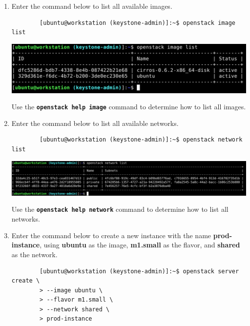 \documentclass[letterpaper, 12pt]{article}
\begin{document}
\begin{enumerate}
    \item Enter the command below to list all available images.
    \begin{lstlisting}
        [ubuntu@workstation (keystone-admin)]:~$ openstack image list
    \end{lstlisting}

    \begin{center}
        \includegraphics[width=\linewidth]{images/part2/step11.png}
    \end{center}

    \begin{tipbox}
        Use the \textbf{\texttt{openstack help image}} command to determine how to list all images.
    \end{tipbox}

    \item Enter the command below to list all available networks.
    \begin{lstlisting}
        [ubuntu@workstation (keystone-admin)]:~$ openstack network list
    \end{lstlisting}

    \begin{center}
        \includegraphics[width=\linewidth]{images/part2/step12.png}
    \end{center}

    \begin{tipbox}
        Use the \textbf{\texttt{openstack help network}} command to determine how to list all networks.
    \end{tipbox}

    \item Enter the command below to create a new instance with the name \textbf{prod-instance}, using
    \textbf{ubuntu} as the image, \textbf{m1.small} as the flavor, and \textbf{shared} as the network.
    \begin{lstlisting}
        [ubuntu@workstation (keystone-admin)]:~$ openstack server create \
        > --image ubuntu \
        > --flavor m1.small \
        > --network shared \
        > prod-instance
    \end{lstlisting}


\end{enumerate}
\end{document}
